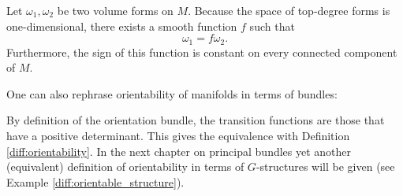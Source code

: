     \begin{property}
        Let $\omega_1,\omega_2$ be two volume forms on $M$. Because the space of top-degree forms is one-dimensional, there exists a smooth function $f$ such that \[\omega_1 = f\omega_2.\] Furthermore, the sign of this function is constant on every connected component of $M$.
    \end{property}

    One can also rephrase orientability of manifolds in terms of bundles:

    \begin{remark}
        By definition of the orientation bundle, the transition functions are those that have a positive determinant. This gives the equivalence with Definition \ref{diff:orientability}. In the next chapter on principal bundles yet another (equivalent) definition of orientability in terms of $G$-structures will be given (see Example \ref{diff:orientable_structure}).
    \end{remark}

